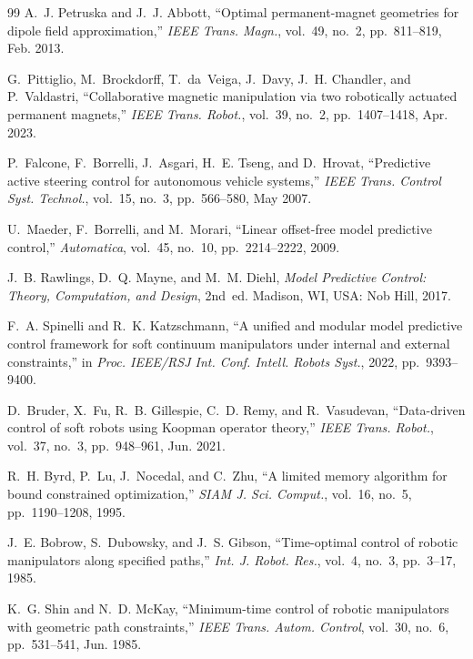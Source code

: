 \documentclass[journal]{IEEEtran}
\begin{document}
\begin{thebibliography}{99}
A.~J. Petruska and J.~J. Abbott, ``Optimal permanent-magnet geometries for
dipole field approximation,'' \emph{IEEE Trans. Magn.}, vol.~49, no.~2,
pp.~811--819, Feb. 2013.

G.~Pittiglio, M.~Brockdorff, T.~da~Veiga, J.~Davy, J.~H. Chandler, and
P.~Valdastri, ``Collaborative magnetic manipulation via two robotically
actuated permanent magnets,'' \emph{IEEE Trans. Robot.}, vol.~39, no.~2,
pp.~1407--1418, Apr. 2023.

P.~Falcone, F.~Borrelli, J.~Asgari, H.~E. Tseng, and D.~Hrovat,
``Predictive active steering control for autonomous vehicle systems,''
\emph{IEEE Trans. Control Syst. Technol.}, vol.~15, no.~3, pp.~566--580,
May 2007.

U.~Maeder, F.~Borrelli, and M.~Morari, ``Linear offset-free model
predictive control,'' \emph{Automatica}, vol.~45, no.~10,
pp.~2214--2222, 2009.

J.~B. Rawlings, D.~Q. Mayne, and M.~M. Diehl, \emph{Model Predictive
Control: Theory, Computation, and Design}, 2nd~ed. Madison, WI, USA: Nob
Hill, 2017.

F.~A. Spinelli and R.~K. Katzschmann, ``A unified and modular model
predictive control framework for soft continuum manipulators under
internal and external constraints,'' in \emph{Proc. IEEE/RSJ Int. Conf.
Intell. Robots Syst.}, 2022, pp.~9393--9400.

D.~Bruder, X.~Fu, R.~B. Gillespie, C.~D. Remy, and R.~Vasudevan,
``Data-driven control of soft robots using Koopman operator theory,''
\emph{IEEE Trans. Robot.}, vol.~37, no.~3, pp.~948--961, Jun. 2021.

R.~H. Byrd, P.~Lu, J.~Nocedal, and C.~Zhu, ``A limited memory algorithm
for bound constrained optimization,'' \emph{SIAM J. Sci. Comput.},
vol.~16, no.~5, pp.~1190--1208, 1995.

J.~E. Bobrow, S.~Dubowsky, and J.~S. Gibson, ``Time-optimal control of
robotic manipulators along specified paths,'' \emph{Int. J. Robot. Res.},
vol.~4, no.~3, pp.~3--17, 1985.

K.~G. Shin and N.~D. McKay, ``Minimum-time control of robotic
manipulators with geometric path constraints,'' \emph{IEEE Trans. Autom.
Control}, vol.~30, no.~6, pp.~531--541, Jun. 1985.


\end{thebibliography}
\end{document}
